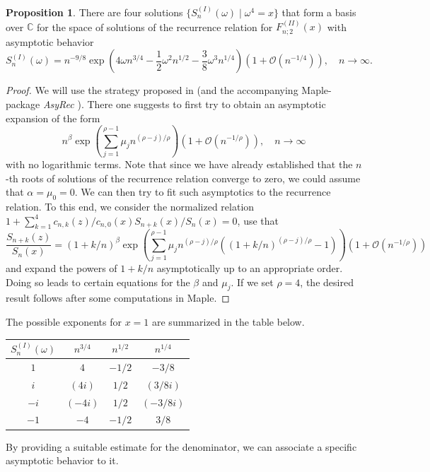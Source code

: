 \documentclass[a4paper,12pt,oneside]{article}
\theoremstyle{definition}
\newtheorem{prop}[defi]{Proposition}
\newcommand{\C}{\mathbb{C}}
\newcommand{\BO}{\mathcal{O}}
\begin{document}
\begin{prop} \label{I_AQ_BT}
    There are four solutions $\{S_n^{(I)}(\omega) \mid \omega^4=x\}$ that form a basis over $\C$ for the space of solutions of the recurrence relation for $F_{n;2}^{(II)}(x)$ with asymptotic behavior
    $$S_{n}^{(I)}(\omega) = n^{-9/8} \exp\left(4\omega n^{3/4} - \frac{1}{2}\omega^2 n^{1/2} - \frac{3}{8}\omega^3 n^{1/4} \right) \left(1+\BO(n^{-1/4})\right),\quad n\to\infty.$$
\end{prop}
\begin{proof}
    We will use the strategy proposed in \cite{WimpZeil} (and the accompanying Maple-package \textit{AsyRec} \cite{Zeil}). There one suggests to first try to obtain an asymptotic expansion of the form 
    $$n^{\beta} \exp\left(\sum_{j=1}^{\rho-1} \mu_{j} n^{(\rho-j)/\rho}\right) \left(1+\BO(n^{-1/\rho})\right),\quad n\to\infty $$
    with no logarithmic terms. Note that since we have already established that the $n$-th roots of solutions of the recurrence relation converge to zero, we could assume that $\alpha=\mu_0=0$. We can then try to fit such asymptotics to the recurrence relation. To this end, we consider the normalized relation $1 + \sum_{k=1}^4 c_{n,k}(z)/c_{n,0}(x) S_{n+k}(x)/S_{n}(x) = 0 $, use that 
        $$\frac{S_{n+k}(z)}{S_{n}(x)} = (1+k/n)^{\beta} \exp\left(\sum_{j=1}^{\rho-1} \mu_j n^{(\rho-j)/\rho}((1+k/n)^{(\rho-j)/\rho}-1)\right) \left(1+\BO(n^{-1/\rho})\right) $$
    and expand the powers of $1+k/n$ asymptotically up to an appropriate order. Doing so leads to certain equations for the $\beta$ and $\mu_j$. If we set $\rho=4$, the desired result follows after some computations in Maple.
\end{proof}

The possible exponents for $x=1$ are summarized in the table below.

\begin{center}
\begin{tabular}{c||c|c|c}
    $S_n^{(I)}(\omega)$ & $n^{3/4}$ & $n^{1/2}$ & $n^{1/4}$ \\ \hline
    $1$ & $4$ & $-1/2$ & $-3/8$ \\
    $i$ & $(4i)$ & $1/2$ & $(3/8i)$ \\
    $-i$ & $(-4i)$ & $1/2$ & $(-3/8i)$ \\
    $-1$ & $-4$ & $-1/2$ & $3/8$ \\
\end{tabular}
\end{center}

By providing a suitable estimate for the denominator, we can associate a specific asymptotic behavior to it.
\end{document}
